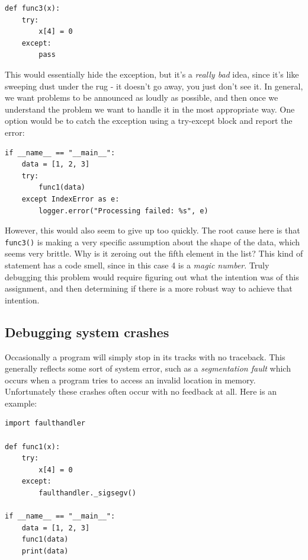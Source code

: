 \begin{lstlisting}[style=Python]
def func3(x):
    try:
        x[4] = 0
    except:
        pass
\end{lstlisting}

This would essentially hide the exception, but it's a \textit{really bad} idea, since it's like sweeping dust under the rug - it doesn't go away, you just don't see it.   In general, we want problems to be announced as loudly as possible, and then once we understand the problem we want to handle it in the most appropriate way.  One option would be to catch the exception using a try-except block and report the error:

\begin{lstlisting}[style=Python]
if __name__ == "__main__":
    data = [1, 2, 3]
    try:
        func1(data)
    except IndexError as e:
        logger.error("Processing failed: %s", e)
\end{lstlisting}

However, this would also seem to give up too quickly.  The root cause here is that \texttt{func3()} is making a very specific assumption about the shape of the data, which seems very brittle.  Why is it zeroing out the fifth element in the list?  This kind of statement has a code smell, since in this case 4 is a \textit{magic number}.  Truly debugging this problem would require figuring out what the intention was of this assignment, and then determining if there is a more robust way to achieve that intention.

\subsection{Debugging system crashes}

Occasionally a program will simply stop in its tracks with no traceback.  This generally reflects some sort of system error, such as a \textit{segmentation fault} which occurs when a program tries to access an invalid location in memory.  Unfortunately these crashes often occur with no feedback at all. Here is an example:

\begin{lstlisting}[style=Python]
import faulthandler

def func1(x):
    try:
        x[4] = 0
    except:
        faulthandler._sigsegv()

if __name__ == "__main__":
    data = [1, 2, 3]
    func1(data)
    print(data)
\end{lstlisting}

